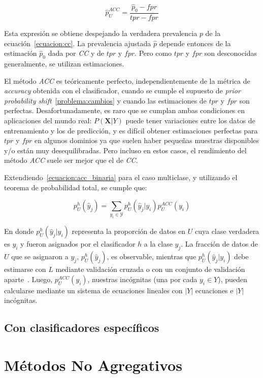 \begin{equation}
    \hat p^{ACC}_{U} = \frac{\hat p_0-fpr}{tpr-fpr}\label{ecuacion:acc_binaria}
\end{equation}

Esta expresión se obtiene despejando la verdadera prevalencia $p$ de la
ecuación~\ref{ecuacion:cc}. La prevalencia ajustada $\hat p$ depende entonces de
la estimación $\hat p_0$ dada por {\it CC\/} y de $tpr$ y $fpr$. Pero como $tpr$
y $fpr$ son desconocidas generalmente, se utilizan estimaciones.

El método {\it ACC\/} es teóricamente perfecto, independientemente de la métrica
de {\it accuracy\/} obtenida con el clasificador, cuando se cumple el supuesto
de {\it prior probability shift\/}~\ref{problema:cambios} y cuando las
estimaciones de $tpr$ y $fpr$ son perfectas. Desafortunadamente, es raro que se
cumplan ambas condiciones en aplicaciones del mundo real: $P(\mathbf{X}|Y)$
puede tener variaciones entre los datos de entrenamiento y los de predicción, y
es difícil obtener estimaciones perfectas para $tpr$ y $fpr$ en algunos dominios
ya que suelen haber pequeñas muestras disponibles y/o están muy desequilibradas.
Pero incluso en estos casos, el rendimiento del método {\it ACC\/} suele ser
mejor que el de {\it CC}.

Extendiendo~\ref{ecuacion:acc_binaria} para el caso multiclase, y utilizando el
teorema de probabilidad total, se cumple que:

\begin{equation}
    p_{U}^{h}(\hat y_j) = \sum _{y_i\in {\mathcal {Y}}}{p^{h}_{U}(\hat y_j|y_i)p^{ACC}_U(y_i)}\label{ecuacion:acc_multiclase}
\end{equation}

En donde $p^{h}_{U}(\hat y_j|y_i)$ representa la proporción de datos en $U$ cuya
clase verdadera es $y_i$ y fueron asignados por el clasificador $h$ a la clase
$y_j$. La fracción de datos de $U$ que se asignaron a $y_j$, $p_{U}^{h}(\hat
y_j)$, es observable, mientras que $p^{h}_{U}(\hat y_j|y_i)$ debe estimarse con
$L$ mediante validación cruzada o con un conjunto de validación
aparte~\cite{barranquero2013study, forman2005counting, forman2008quantifying}.
Luego, $p^{ACC}_U(y_i)$, nuestras incógnitas (una por cada $y_i \in Y$), pueden
calcularse mediante un sistema de ecuaciones lineales con $|Y|$ ecuaciones e
$|Y|$ incógnitas.

\subsection{Con clasificadores específicos}

\section{Métodos No Agregativos}

